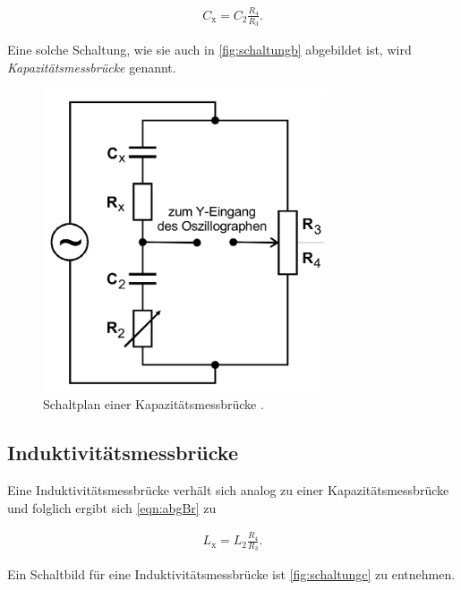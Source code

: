 \begin{align}
    C_{\text{x}} = C_2 \frac{R_4}{R_3}.
\end{align}

Eine solche Schaltung, wie sie auch in
\autoref{fig:schaltungb} abgebildet ist, wird \textit{Kapazitätsmessbrücke} genannt.

\begin{figure}[H]
    \centering
    \includegraphics[width=0.75\textwidth]{dateien/aufgabeb).png}
    \caption{Schaltplan einer Kapazitätsmessbrücke \cite{anleitung}.}
    \label{fig:schaltungb}
\end{figure}

\subsection{Induktivitätsmessbrücke}

Eine Induktivitätsmessbrücke verhält sich analog zu einer Kapazitätsmessbrücke und folglich ergibt sich 
\autoref{eqn:abgBr} zu

\begin{align}
    L_{\text{x}} = L_2 \frac{R_4}{R_3}.
\end{align}

Ein Schaltbild für eine Induktivitätsmessbrücke ist \autoref{fig:schaltungc} zu entnehmen.

